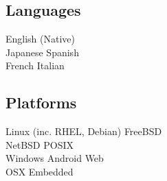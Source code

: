 \documentclass[a4paper]{cv}
\begin{document}
\begin{minipage}[t]{0.33\textwidth}
\sectionspace %

\subsection{Languages}
English (Native) \\\vspace{4pt}
Japanese \textbullet{} Spanish \\\vspace{4pt}
French \textbullet{} Italian

\sectionspace %

\subsection{Platforms}
Linux (inc. RHEL, Debian) \textbullet{} FreeBSD \\
NetBSD \textbullet{} POSIX \\\vspace{4pt}
Windows \textbullet{} Android \textbullet{} Web \\\vspace{4pt}
OSX \textbullet{} Embedded


\end{minipage} %
\hfill
%
%
\end{document}

